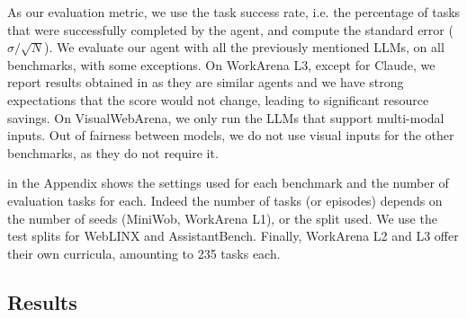 \documentclass[10pt]{article} %
\begin{document}
As our evaluation metric, we use the task success rate, i.e. the percentage of tasks that were successfully completed by the agent, and compute the standard error ($\sigma / \sqrt{N}$). We evaluate our agent with all the previously mentioned LLMs, on all benchmarks, with some exceptions. On WorkArena L3, except for Claude, we report results obtained in \citet{workarena-plus-plus} as they are similar agents and we have strong expectations that the score would not change, leading to significant resource savings. On VisualWebArena, we only run the LLMs that support multi-modal inputs. Out of fairness between models, we do not use visual inputs for the other benchmarks, as they do not require it.

 in the Appendix shows the settings used for each benchmark and the number of evaluation tasks for each. Indeed the number of tasks (or episodes) depends on the number of seeds (MiniWob, WorkArena L1), or the split used. We use the test splits for WebLINX and AssistantBench. Finally, WorkArena L2 and L3 offer their own curricula, amounting to 235 tasks each.

\subsection{Results}
\end{document}
